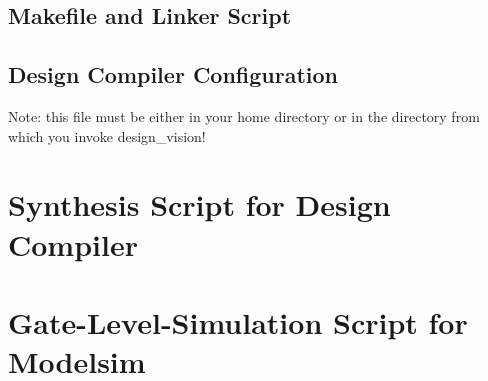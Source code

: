 \begin{appendix}
\newpage
\subsection{Makefile and Linker Script}
\label{makefile}
\label{linkerscript}

\newpage
\subsection{Design Compiler Configuration}

Note: this file must be either in your home directory or in the directory from which you invoke design\_vision!
\newpage
\section{Synthesis Script for Design Compiler}
\label{tut:syn}

\newpage
\section{Gate-Level-Simulation Script for Modelsim}
\label{tut:gls}

\end{appendix}

